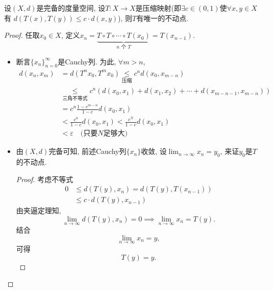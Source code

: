 \begin{theorem}[压缩映射定理]
    设$(X,d)$是完备的度量空间, 设$T\colon X \to X$是压缩映射(即$\exists c \in (0,1)$使$\forall x,y \in X$有 $d(T(x),T(y)) \le c \cdot d(x,y)$), 则$T$有唯一的不动点.
\end{theorem}
\begin{proof}
    任取$x_0 \in X$, 定义$x_n = \underbrace{T \circ T \circ \cdots \circ T(x_0)}_{n \text{ 个 }T} = T(x_{n-1})$.
    \begin{itemize}
        \item 断言$\{ x_n \}_{n=0}^{\infty}$是Cauchy列. 为此, $\forall m > n$,
        \begin{equation}
            \begin{aligned}
                d(x_n, x_m) & = d(T^{n} x_0, T^{m}x_0) \mathop{\le }\limits^{}_{\text{压缩}} c^{n} d(x_0, x_{m-n})
                \\
                &  \mathop{\le }\limits^{}_{\text{三角不等式}}c^{n} \left( d(x_0,x_1) + d(x_1,x_2)+ \cdots + d(x_{m-n-1}, x_{m-n}) \right) 
                \\
                & = c^{n} \frac{1- c^{m-n}}{1-c} d(x_0,x_1)
                \\
                & < \frac{c^{n}}{1-c} d(x_0,x_1) < \frac{c^{N}}{1-c} d(x_0,x_1) 
                \\
                & < \varepsilon \quad \text{(只要$N$足够大)}
            \end{aligned}
        \end{equation}
            
        \item 由$(X,d)$完备可知, 前述Cauchy列$\{ x_n \}$收敛, 设$\displaystyle \lim_{n \to \infty} x_n = y_0$, 来证$y_0$是$T$的不动点.
        \begin{proof}
            考虑不等式
        \begin{equation}
          \begin{aligned}
            0 & \le d(T(y), x_n) = d(T(y), T(x_{n-1}))
            \\
            & \le c\cdot d(T(y),x_{n-1})
          \end{aligned}
        \end{equation}
        由夹逼定理知, 
        \begin{equation}
          \lim_{n \to \infty} d(T(y), x_n) = 0 \implies \lim_{n \to \infty} x_n = T(y).
        \end{equation}
        结合
        \begin{equation}
          \lim_{n \to \infty} x_n = y,
        \end{equation}
        可得
        \begin{equation}
          T(y) = y.
        \end{equation}
        \end{proof}


\end{itemize}
\end{proof}
